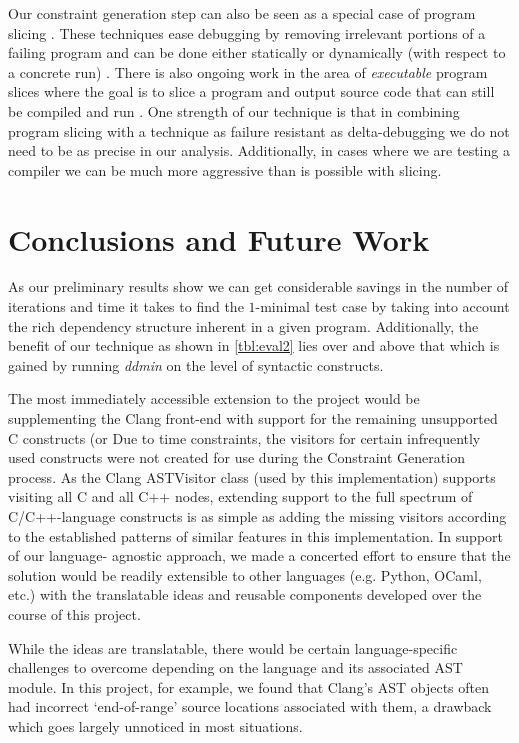 \documentclass[preprint]{acm_proc_article-sp}
\begin{document}
Our constraint generation step can also be seen as a special case of program
slicing \citep{weiser81} \citep{tip94}. These techniques ease debugging by
removing irrelevant portions of a failing program and can be done either
statically or dynamically (with respect to a concrete run)
\citep{agrawal90}. There is also ongoing work in the area of \emph{executable}
program slices where the goal is to slice a program and output source code
that can still be compiled and run \citep{horwitz10}. One strength of our
technique is that in combining program slicing with a technique as failure
resistant as delta-debugging we do not need to be as precise in our
analysis. Additionally, in cases where we are testing a compiler we can be much
more aggressive than is possible with slicing.


\section{Conclusions and Future Work}
As our preliminary results show we can get considerable savings in the number of
iterations and time it takes to find the $1$-minimal test case by taking into
account the rich dependency structure inherent in a given program. Additionally,
the benefit of our technique as shown in \autoref{tbl:eval2} lies over and above
that which is gained by running \emph{ddmin} on the level of syntactic
constructs.

The most immediately accessible extension to the project would be supplementing
the Clang front-end with support for the remaining unsupported C constructs (or
Due to time constraints, the visitors for certain infrequently used constructs
were not created for use during the Constraint Generation process. As the Clang
ASTVisitor class (used by this implementation) supports visiting all C and all
C++ nodes, extending support to the full spectrum of C/C++-language constructs
is as simple as adding the missing visitors according to the established
patterns of similar features in this implementation. In support of our language-
agnostic approach, we made a concerted effort to ensure that the solution would
be readily extensible to other languages (e.g. Python, OCaml, etc.) with the
translatable ideas and reusable components developed over the course of this
project.

While the ideas are translatable, there would be certain language-specific
challenges to overcome depending on the language and its associated AST module.
In this project, for example, we found that Clang's AST objects often had
incorrect `end-of-range' source locations associated with them, a drawback which
goes largely unnoticed in most situations.
\end{document}
